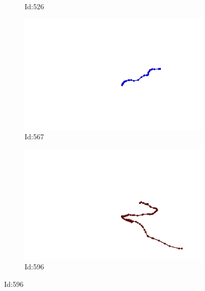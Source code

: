 \documentclass[12pt,twoside]{report}
\begin{document}
\begin{figure}
\begin{subfigure}[b]{0.20\textwidth}
\caption{Id:526}
\end{subfigure}
\begin{subfigure}[b]{0.20\textwidth}
\centering
\includegraphics[width=\textwidth]{../trajectories/567.png}
\caption{Id:567}
\end{subfigure}
\begin{subfigure}[b]{0.20\textwidth}
\centering
\includegraphics[width=\textwidth]{../trajectories/596.png}
\caption{Id:596}
\end{subfigure}
\end{figure}
\end{document}
